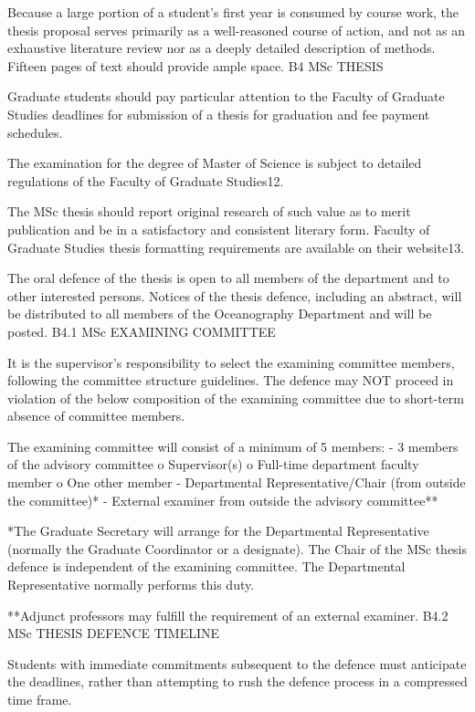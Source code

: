 \documentclass{article}
\begin{document}
Because a large portion of a student’s first year is consumed by course work, the thesis proposal serves primarily as a well-reasoned course of action, and not as an exhaustive literature review nor as a deeply detailed description of methods. Fifteen pages of text should provide ample space.
B4	MSc THESIS

Graduate students should pay particular attention to the Faculty of Graduate Studies deadlines for submission of a thesis for graduation and fee payment schedules.
 

The examination for the degree of Master of Science is subject to detailed regulations of the Faculty of Graduate Studies12.

The MSc thesis should report original research of such value as to merit publication and be in a satisfactory and consistent literary form. Faculty of Graduate Studies thesis formatting requirements are available on their website13.

The oral defence of the thesis is open to all members of the department and to other interested persons. Notices of the thesis defence, including an abstract, will be distributed to all members of the Oceanography Department and will be posted.
B4.1	MSc EXAMINING COMMITTEE

It is the supervisor’s responsibility to select the examining committee members, following the committee structure guidelines. The defence may NOT proceed in violation of the below composition of the examining committee due to short-term absence of committee members.

The examining committee will consist of a minimum of 5 members:
-	3 members of the advisory committee
o	Supervisor(s)
o	Full-time department faculty member
o	One other member
-	Departmental Representative/Chair (from outside the committee)*
-	External examiner from outside the advisory committee**

*The Graduate Secretary will arrange for the Departmental Representative (normally the Graduate Coordinator or a designate). The Chair of the MSc thesis defence is independent of the examining committee. The Departmental Representative normally performs this duty.

**Adjunct professors may fulfill the requirement of an external examiner.
B4.2	MSc THESIS DEFENCE TIMELINE

Students with immediate commitments subsequent to the defence must anticipate the deadlines, rather than attempting to rush the defence process in a compressed time frame.
\end{document}
